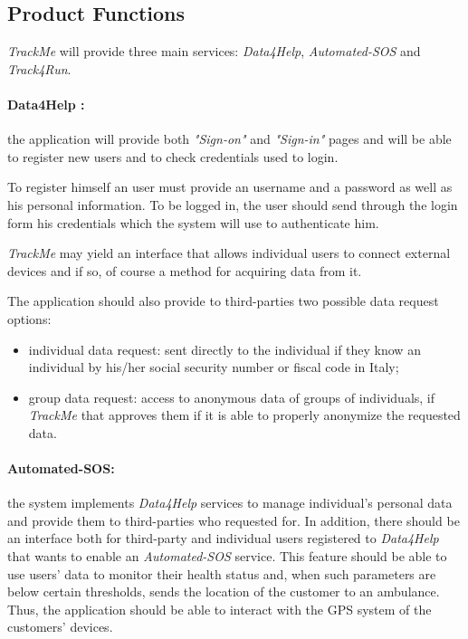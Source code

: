 \documentclass[a4paper]{article}
\begin{document}
    \subsection{Product Functions}
    \textit{TrackMe} will provide three main services: \textit{Data4Help}, \textit{Automated-SOS} and \textit{Track4Run}.
    
    \paragraph{Data4Help :}
    the application will provide both \textit{"Sign-on"} and \textit{"Sign-in"} pages and will be able to register new users and to check credentials used to login.
    
    To register himself an user must provide an username and a password as well as his personal information. To be logged in, the user should send through the login form his credentials which the system will use to authenticate him.
    
    \textit{TrackMe} may yield an interface that allows individual users to connect external devices and if so, of course a method for acquiring data from it.
    
    The application should also provide to third-parties two possible data request options:
    \begin{itemize}
        \item individual data request: sent directly to the individual if they know an  individual by his/her social security number or fiscal code in Italy;
        \item group data request: access  to  anonymous  data  of  groups  of  individuals, if \textit{TrackMe}  that  approves  them  if  it  is  able  to  properly  anonymize  the  requested  data.
    \end{itemize}
    
    \paragraph{Automated-SOS:} the system implements \textit{Data4Help} services to manage individual's personal data and provide them to third-parties who requested for. In addition, there should be an interface both for third-party and individual users registered to \textit{Data4Help} that wants to enable an \textit{Automated-SOS} service. This feature should be able to use users' data to monitor their health status and, when such parameters are below certain thresholds, sends the location of the customer to an ambulance. Thus, the application should be able to interact with the GPS system of the customers' devices.
    
\end{document}
